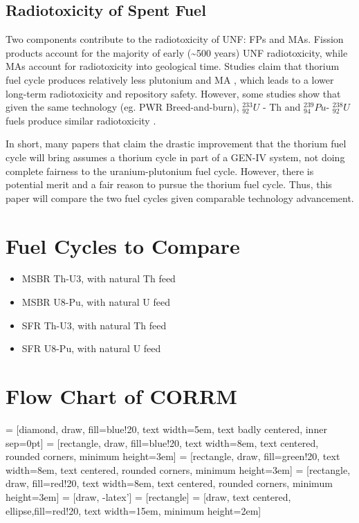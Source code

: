 \documentclass{article}
\newcommand{\uthree}{\xspace $^{233}_{92}U$ \xspace}
\newcommand{\ueight}{\xspace $^{238}_{92}U$\xspace}
\newcommand{\pu}{\xspace$^{239}_{94}Pu$\xspace}
\begin{document}
\subsection{Radiotoxicity of Spent Fuel}
Two components contribute to the radiotoxicity of 
\gls{UNF}: \glspl{FP} and \glspl{MA}.
Fission products account for the majority of early (\textasciitilde 500 years)
\gls{UNF} radiotoxicity, while \glspl{MA} account for 
radiotoxicity into geological time.
Studies claim that thorium fuel cycle produces relatively
less plutonium and \gls{MA} \cite{boczar_thorium_2002} \cite{david_revisiting_2007},
which leads to a lower long-term radiotoxicity and repository safety.
However, some studies show that given the same technology (eg. \gls{PWR} Breed-and-burn),
\uthree - Th and \pu - \ueight fuels produce similar radiotoxicity \cite{croff_comparative_2016}.

In short, many papers that claim the drastic improvement that the thorium
fuel cycle will bring assumes a thorium cycle in part of a GEN-IV system,
not doing complete fairness to the uranium-plutonium fuel cycle. However,
there is potential merit and a fair reason to pursue the thorium fuel cycle.
Thus, this paper will compare the two fuel cycles given comparable technology
advancement. 




%

\section{Fuel Cycles to Compare}
\begin{itemize}
\item MSBR Th-U3, with natural Th feed \cite{robertson_conceptual_1971}
\item MSBR U8-Pu, with natural U feed
\item SFR Th-U3, with natural Th feed
\item SFR U8-Pu, with natural U feed
\end{itemize}


\section{Flow Chart of \gls{CORRM}}

 = [diamond, draw, fill=blue!20, 
    text width=5em, text badly centered,  inner sep=0pt]
 = [rectangle, draw, fill=blue!20, 
    text width=8em, text centered, rounded corners, minimum height=3em]
 = [rectangle, draw, fill=green!20, 
    text width=8em, text centered, rounded corners, minimum height=3em]
 = [rectangle, draw, fill=red!20, 
    text width=8em, text centered, rounded corners, minimum height=3em]
 = [draw, -latex']
 = [rectangle]
 = [draw, text centered, ellipse,fill=red!20, text width=15em,
    minimum height=2em]
\end{document}

